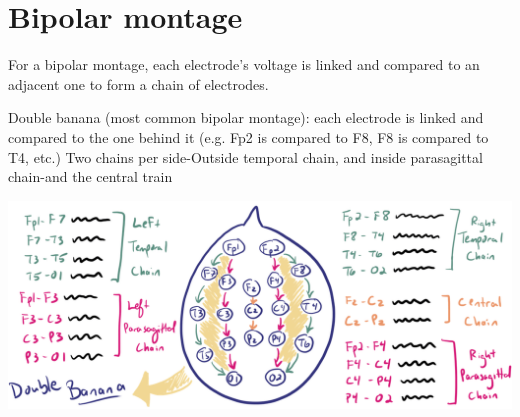 \documentclass[12pt]{article}
\begin{document}
\section{Bipolar montage} 
For a bipolar montage, each electrode’s voltage is linked and compared to an adjacent one to form a chain of electrodes.

Double banana (most common bipolar montage): each electrode is linked and compared to the one behind it (e.g. Fp2 is compared to F8, F8 is compared to T4, etc.) 
Two chains per side-Outside temporal chain, and inside parasagittal chain-and the central train 

\includegraphics[scale=0.4]{doubleBanana}
\end{document}
